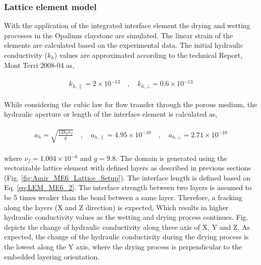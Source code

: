 \subsubsection*{Lattice element model}

With the application of the integrated interface element \cite{Sattarietal2019b} the drying and wetting processes in the Opalinus claystone are simulated. The linear strain of the elements are calculated based on the experimental data. The initial hydraulic conductivity ($k_h$) values are approximated according to the technical Report, Mont Terri 2008-04 as,

\begin{align}
\label{eq:LEM_ME6_1}
\begin{split}
k_{h,\parallel}=2\times{10}{^{-13}}
\quad , \quad
k_{h,\bot}=0.6\times{10}{^{-13}}
\end{split}
\end{align}

While considering the cubic law for flow transfer through the porous medium, the hydraulic aperture or length of the interface element is calculated as,

\begin{align}
\label{eq:LEM_ME6_2}
\begin{split}
a_h=\sqrt{\frac{12k_h\nu_f}{g}}
\quad , \quad
a_{h,\parallel}=4.95\times{10}{^{-10}}
\quad , \quad
a_{h,\bot}=2.71\times{10}{^{-10}}
\end{split}
\end{align}

where $\nu_f=1.004\times{10}{^{-6}}$ and $g=9.8$. The domain is generated using the vectorizable lattice element with defined layers as described in previous sections (Fig. \ref{fig:Amir_ME6_Lattice_Setup}). The interface length is defined based on Eq. \ref{eq:LEM_ME6_2}. The interface strength between two layers is assumed to be 5 times weaker than the bond between a same layer. Therefore, a fracking along the layers (X and Z direction) is expected, Which results in higher hydraulic conductivity values as the wetting and drying process continues. Fig. depicts the change of hydraulic conductivity along three axis of X, Y and Z. As expected, the change of the hydraulic conductivity during the drying process is the lowest along the Y axis, where the drying process is perpendicular to the embedded layering orientation. 

